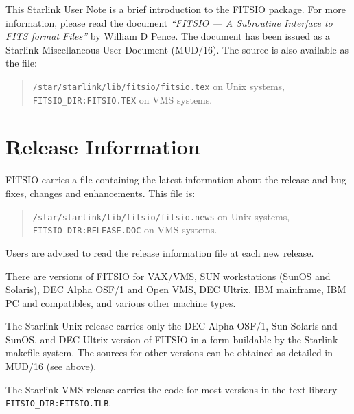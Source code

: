 This Starlink User Note is a brief introduction to the FITSIO package.
For more information, please read the document {\em ``FITSIO --- A
Subroutine Interface to FITS format Files''\/} by William D Pence. The
document has been issued as a Starlink Miscellaneous User Document
(MUD/16). The source is also available as the file:

\begin{verse}
{\tt /star/starlink/lib/fitsio/fitsio.tex} on Unix systems, \\
{\tt FITSIO\_DIR:FITSIO.TEX} on VMS systems.
\end{verse}

\section {Release Information}

FITSIO carries a file containing the latest information about the
release and bug fixes, changes and enhancements. This file is:

\begin{verse}
{\tt /star/starlink/lib/fitsio/fitsio.news} on Unix systems, \\
{\tt FITSIO\_DIR:RELEASE.DOC} on VMS systems.
\end{verse}

Users are advised to read the release information file at each new
release.

There are versions of FITSIO for VAX/VMS, SUN workstations (SunOS and
Solaris), DEC Alpha OSF/1 and Open VMS, DEC Ultrix, IBM mainframe, IBM
PC and compatibles, and various other machine types.

The Starlink Unix release carries only the DEC Alpha OSF/1, Sun Solaris
and SunOS, and DEC Ultrix version of FITSIO in a form buildable by the
Starlink makefile system. The sources for other versions can be
obtained as detailed in MUD/16 (see above).

The Starlink VMS release carries the code for most versions in the text
library {\tt FITSIO\_DIR:\-FITSIO.TLB}.


